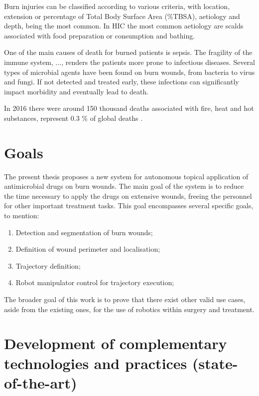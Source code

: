 Burn injuries can be classified according to various criteria, with location, extension or percentage of Total Body Surface Area (\%TBSA), aetiology and depth, being the most common. In HIC the most common aetiology are scalds associated with food preparation or consumption and bathing.

One of the main causes of death for burned patients is sepsis. The fragility of the immune system, ..., renders the patients more prone to infectious diseases. Several types of microbial agents have been found on burn wounds, from bacteria to virus and fungi. If not detected and treated early, these infections can significantly impact morbidity and eventually lead to death.

In 2016 there were around 150 thousand deaths associated with fire, heat and hot substances, represent 0.3 \% of global deaths \cite{GHE2016_xls}.


\section{Goals} %
\label{sec:goals}

The present thesis proposes a new system for autonomous topical application of antimicrobial drugs on burn wounds. The main goal of the system is to reduce the time necessary to apply the drugs on extensive wounds, freeing the personnel for other important treatment tasks. This goal encompasses several specific goals, to mention:
\begin{enumerate}
    \item Detection and segmentation of burn wounds;
    \item Definition of wound perimeter and localisation;
    \item Trajectory definition;
    \item Robot manipulator control for trajectory execution;
\end{enumerate}
The broader goal of this work is to prove that there exist other valid use cases, aside from the existing ones, for the use of robotics within surgery and treatment.


\section{Development of complementary technologies and practices (state-of-the-art)} %
\label{sec:development_of_complementary_technologies_and_practices}


